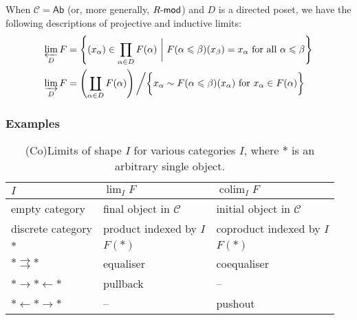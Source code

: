 \documentclass[10pt]{article}
\newcommand{\Rmod}{R\hbox{-}\mathsf{mod}}
\newcommand{\Ab}{\mathsf{Ab}}
\newcommand{\ccat}{\mathcal{C}}
\DeclareMathOperator*{\colim}{colim}
\begin{document}
                When $\ccat=\Ab$ (or, more generally, $\Rmod$) and $D$ is a directed poset, we have the following descriptions of projective and inductive limits:
                \begin{align*}
                    \varprojlim_D F &= \left\{ (x_\alpha)\in\prod_{\alpha\in D}F(\alpha) \,\,\bigg|\,\, F(\alpha\leqslant\beta)(x_\beta)=x_\alpha\text{ for all }\alpha\leqslant\beta \right\}\\
                    \varinjlim_D F &= \left(\coprod_{\alpha\in D}F(\alpha)\right) \bigg/ \bigg\{ x_\alpha\sim F(\alpha\leqslant\beta)(x_\alpha) \text{ for }x_\alpha\in F(\alpha) \bigg\}
                \end{align*}

            \subsubsection{Examples}\label{sssec:examples-of-co-limits}

                \begin{table}[!ht]
                    \centering
                    \begin{tabular}{lll}
                        $I$ & $\lim_I F$ & $\colim_I F$\\
                        \toprule
                        empty category & final object in $\ccat$ & initial object in $\ccat$\\
                        discrete category & product indexed by $I$ & coproduct indexed by $I$\\
                        $*$ & $F(*)$ & $F(*)$\\
                        $*\rightrightarrows*$ & equaliser & coequaliser\\[1em]
                        $*\rightarrow*\leftarrow*$ & pullback & --\\
                        $*\leftarrow*\rightarrow*$ & -- & pushout
                    \end{tabular}
                    \caption{(Co)Limits of shape $I$ for various categories $I$, where $*$ is an arbitrary single object.}\label{tb:limits-for-various-I}
                \end{table}
\end{document}
